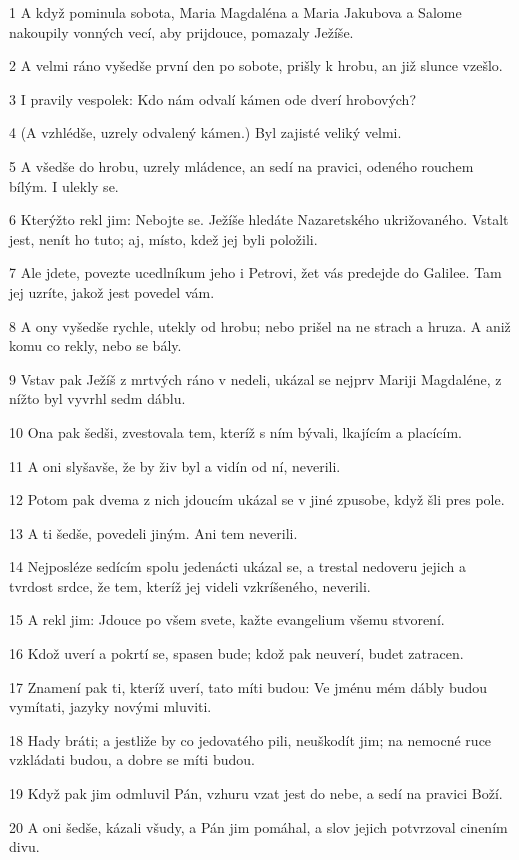 \par 1 A když pominula sobota, Maria Magdaléna a Maria Jakubova a Salome nakoupily vonných vecí, aby prijdouce, pomazaly Ježíše.
\par 2 A velmi ráno vyšedše první den po sobote, prišly k hrobu, an již slunce vzešlo.
\par 3 I pravily vespolek: Kdo nám odvalí kámen ode dverí hrobových?
\par 4 (A vzhlédše, uzrely odvalený kámen.) Byl zajisté veliký velmi.
\par 5 A všedše do hrobu, uzrely mládence, an sedí na pravici, odeného rouchem bílým. I ulekly se.
\par 6 Kterýžto rekl jim: Nebojte se. Ježíše hledáte Nazaretského ukrižovaného. Vstalt jest, nenít ho tuto; aj, místo, kdež jej byli položili.
\par 7 Ale jdete, povezte ucedlníkum jeho i Petrovi, žet vás predejde do Galilee. Tam jej uzríte, jakož jest povedel vám.
\par 8 A ony vyšedše rychle, utekly od hrobu; nebo prišel na ne strach a hruza. A aniž komu co rekly, nebo se bály.
\par 9 Vstav pak Ježíš z mrtvých ráno v nedeli, ukázal se nejprv Mariji Magdaléne, z nížto byl vyvrhl sedm dáblu.
\par 10 Ona pak šedši, zvestovala tem, kteríž s ním bývali, lkajícím a placícím.
\par 11 A oni slyšavše, že by živ byl a vidín od ní, neverili.
\par 12 Potom pak dvema z nich jdoucím ukázal se v jiné zpusobe, když šli pres pole.
\par 13 A ti šedše, povedeli jiným. Ani tem neverili.
\par 14 Nejposléze sedícím spolu jedenácti ukázal se, a trestal nedoveru jejich a tvrdost srdce, že tem, kteríž jej videli vzkríšeného, neverili.
\par 15 A rekl jim: Jdouce po všem svete, kažte evangelium všemu stvorení.
\par 16 Kdož uverí a pokrtí se, spasen bude; kdož pak neuverí, budet zatracen.
\par 17 Znamení pak ti, kteríž uverí, tato míti budou: Ve jménu mém dábly budou vymítati, jazyky novými mluviti.
\par 18 Hady bráti; a jestliže by co jedovatého pili, neuškodít jim; na nemocné ruce vzkládati budou, a dobre se míti budou.
\par 19 Když pak jim odmluvil Pán, vzhuru vzat jest do nebe, a sedí na pravici Boží.
\par 20 A oni šedše, kázali všudy, a Pán jim pomáhal, a slov jejich potvrzoval cinením divu.


